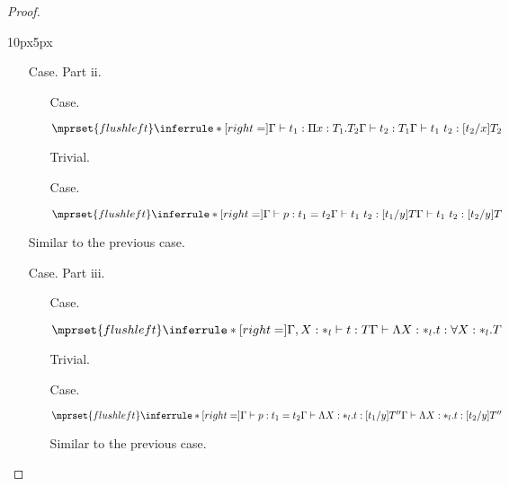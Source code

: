 \begin{proof}
\begin{changemargin}{10px}{5px}
\begin{itemize}
\item[Case.] Part ii.\\
    \vspace{-30px}
  \begin{itemize}
  \item[Case.] \ \\
    \begin{center}
      \begin{math}
        $$\mprset{flushleft}
        \inferrule* [right=] {
          \Gamma \vdash t_1 : \Pi x:T_1.T_2 
          \\
          \Gamma \vdash t_2 : T_1
        }{\Gamma \vdash t_1\ t_2 : [t_2/x]T_2}
      \end{math}  
    \end{center}
    Trivial.
    
  \item[Case.] \ \\
    \begin{center}
      \begin{math}
        $$\mprset{flushleft}
        \inferrule* [right=] {
          \Gamma \vdash p:t_1 = t_2
          \\
          \Gamma \vdash t_1\ t_2:[t_1/y]T
        }{\Gamma \vdash t_1\ t_2:[t_2/y]T}
      \end{math}
    \end{center}
  \end{itemize}
  Similar to the previous case.

\item[Case.] Part iii.\\
    \vspace{-30px}
  \begin{itemize}
  \item[Case.] \ \\
    \begin{center}
      \begin{math}
        $$\mprset{flushleft}
        \inferrule* [right=] {
          \Gamma, X : *_l \vdash t : T
        }{\Gamma \vdash \Lambda X:*_l.t:\forall X : *_l.T}
      \end{math}
    \end{center}
    Trivial.
    
  \item[Case.] \ \\
    \begin{center}
      \begin{math}
        $$\mprset{flushleft}
        \inferrule* [right=] {
          \Gamma \vdash p:t_1 = t_2
          \\
          \Gamma \vdash \Lambda X:*_l.t:[t_1/y]T''
        }{\Gamma \vdash \Lambda X:*_l.t:[t_2/y]T''}
      \end{math}
    \end{center}
    Similar to the previous case.
  \end{itemize}
  

\end{itemize}
\end{changemargin}
\end{proof}
